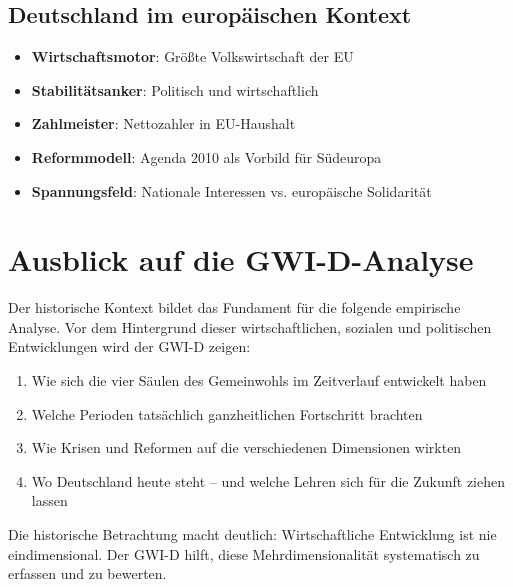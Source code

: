 \subsection{Deutschland im europäischen Kontext}
\begin{itemize}
\item \textbf{Wirtschaftsmotor}: Größte Volkswirtschaft der EU
\item \textbf{Stabilitätsanker}: Politisch und wirtschaftlich
\item \textbf{Zahlmeister}: Nettozahler in EU-Haushalt
\item \textbf{Reformmodell}: Agenda 2010 als Vorbild für Südeuropa
\item \textbf{Spannungsfeld}: Nationale Interessen vs. europäische Solidarität
\end{itemize}

\section{Ausblick auf die GWI-D-Analyse}

Der historische Kontext bildet das Fundament für die folgende empirische Analyse. Vor dem Hintergrund dieser wirtschaftlichen, sozialen und politischen Entwicklungen wird der GWI-D zeigen:

\begin{enumerate}
\item Wie sich die vier Säulen des Gemeinwohls im Zeitverlauf entwickelt haben
\item Welche Perioden tatsächlich ganzheitlichen Fortschritt brachten
\item Wie Krisen und Reformen auf die verschiedenen Dimensionen wirkten
\item Wo Deutschland heute steht – und welche Lehren sich für die Zukunft ziehen lassen
\end{enumerate}

Die historische Betrachtung macht deutlich: Wirtschaftliche Entwicklung ist nie eindimensional. Der GWI-D hilft, diese Mehrdimensionalität systematisch zu erfassen und zu bewerten.